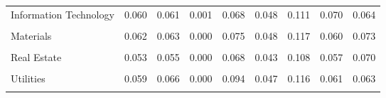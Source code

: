 \begin{table}[H]
\begin{tabular}{lcccccccc}
Information Technology & 0.060 & 0.061 & 0.001 & 0.068 & 0.048 & 0.111 & 0.070 & 0.064 \\\\
Materials & 0.062 & 0.063 & 0.000 & 0.075 & 0.048 & 0.117 & 0.060 & 0.073 \\\\
Real Estate & 0.053 & 0.055 & 0.000 & 0.068 & 0.043 & 0.108 & 0.057 & 0.070 \\\\
Utilities & 0.059 & 0.066 & 0.000 & 0.094 & 0.047 & 0.116 & 0.061 & 0.063 \\\\
            \bottomrule
            \end{tabular}%
            \end{table}